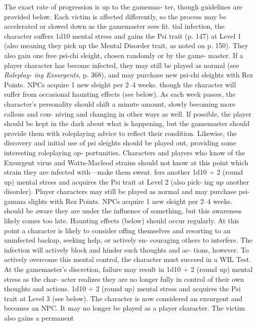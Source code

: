 The exact rate of progression is up to the gamemas-
ter, though guidelines are provided below. Each victim 
is affected differently, so the process may be accelerated 
or slowed down as the gamemaster sees fit.
tial infection, the character suffers 1d10 mental 
stress and gains the Psi trait (p. 147) at Level 1 
(also meaning they pick up the Mental Disorder 
trait, as noted on p. 150). They also gain one free 
psi-chi sleight, chosen randomly or by the game-
master. If a player character has become infected, 
they may still be played as normal (see \textit{Roleplay-}
\textit{ing Exsurgents,} p. 368), and may purchase new 
psi-chi sleights with Rez Points. NPCs acquire 1 
new sleight per 2–4 weeks.
though the character will suffer from occasional 
haunting effects (see below). As each week passes, 
the character's personality should shift a minute 
amount, slowly becoming more callous and con-
niving and changing in other ways as well. If 
possible, the player should be kept in the dark 
about what is happening, but the gamemaster 
should provide them with roleplaying advice to 
reflect their condition. Likewise, the discovery 
and initial use of psi sleights should be played 
out, providing some interesting roleplaying op-
portunities. Characters and players who know of 
the Exsurgent virus and Watts-Macleod strains 
should not know at this point which strain they 
are infected with—make them sweat.
fers another 1d10 ÷ 2 (round up) mental stress 
and acquires the Psi trait at Level 2 (also pick-
ing up another disorder). Player characters may 
still be played as normal and may purchase psi-
gamma slights with Rez Points. NPCs acquire 1 
new sleight per 2–4 weeks.
should be aware they are under the influence 
of something, but this awareness likely comes 
too late. Haunting effects (below) should occur 
regularly. At this point a character is likely to 
consider offing themselves and resorting to an 
uninfected backup, seeking help, or actively en-
couraging others to interfere. The infection will 
actively block and hinder such thoughts and ac-
tions, however. To actively overcome this mental 
control, the character must succeed in a WIL Test. 
At the gamemaster's discretion, failure may result 
in 1d10 ÷ 2 (round up) mental stress as the char-
acter realizes they are no longer fully in control 
of their own thoughts and actions. 
1d10 ÷ 2 (round up) mental stress and acquires 
the Psi trait at Level 3 (see below). The character 
is now considered an exsurgent and becomes 
an NPC. It may no longer be played as a player 
character. The victim also gains a permanent 

